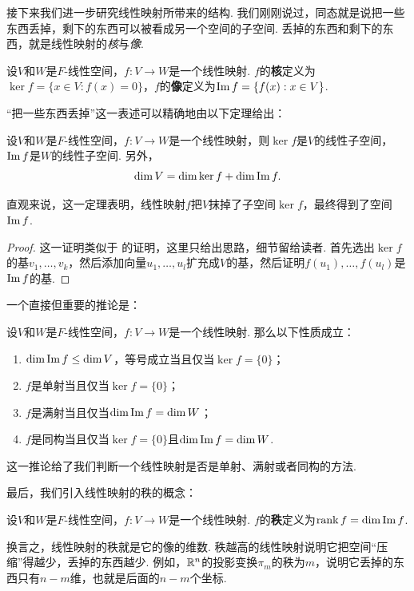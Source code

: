 接下来我们进一步研究线性映射所带来的结构. 我们刚刚说过，同态就是说把一些东西丢掉，剩下的东西可以被看成另一个空间的子空间. 丢掉的东西和剩下的东西，就是线性映射的\textit{核}与\textit{像}. 

\begin{definition}[核与像]\label{definition:kernel-image}
设$V$和$W$是$F$-线性空间，$f:V\to W$是一个线性映射. $f$的\textbf{核}定义为$\ker f=\{x\in V:f(x)=0\}$，$f$的\textbf{像}定义为$\operatorname*{Im} f=\{f(x):x\in V\}$. 
\end{definition}

“把一些东西丢掉”这一表述可以精确地由以下定理给出：

\begin{theorem}\label{theorem:kernel-image-property}
设$V$和$W$是$F$-线性空间，$f:V\to W$是一个线性映射，则$\ker f$是$V$的线性子空间，$\operatorname*{Im} f$是$W$的线性子空间. 另外，
\[\dim V=\dim\ker f+\dim\operatorname*{Im} f.\]
\end{theorem}
直观来说，这一定理表明，线性映射$f$把$V$抹掉了子空间$\ker f$，最终得到了空间$\operatorname*{Im} f$. 
\begin{proof}
这一证明类似于 的证明，这里只给出思路，细节留给读者. 首先选出$\ker f$的基$v_1,\dots,v_k$，然后添加向量$u_1,\dots,u_l$扩充成$V$的基，然后证明$f(u_1),\dots,f(u_l)$是$\operatorname*{Im} f$的基. 
\end{proof}

一个直接但重要的推论是：
\begin{corollary}\label{corollary:kernel-image-isomorphism}
设$V$和$W$是$F$-线性空间，$f:V\to W$是一个线性映射. 那么以下性质成立：
\begin{enumerate}
    \item $\dim \operatorname*{Im} f\leq \dim V$，等号成立当且仅当$\ker f=\{0\}$；
    \item $f$是单射当且仅当$\ker f=\{0\}$；
    \item $f$是满射当且仅当$\dim \operatorname*{Im} f=\dim W$；
    \item $f$是同构当且仅当$\ker f=\{0\}$且$\dim \operatorname*{Im} f=\dim W$. 
\end{enumerate}
\end{corollary}
这一推论给了我们判断一个线性映射是否是单射、满射或者同构的方法. 

最后，我们引入线性映射的秩的概念：
\begin{definition}[线性映射的秩]
设$V$和$W$是$F$-线性空间，$f:V\to W$是一个线性映射. $f$的\textbf{秩}定义为$\operatorname*{rank} f=\dim\operatorname*{Im} f$. 
\end{definition}

换言之，线性映射的秩就是它的像的维数. 秩越高的线性映射说明它把空间“压缩”得越少，丢掉的东西越少. 例如，$\mathbb{R}^n$的投影变换$\pi_m$的秩为$m$，说明它丢掉的东西只有$n-m$维，也就是后面的$n-m$个坐标. 

